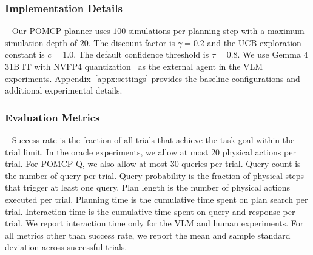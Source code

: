 \subsubsection{Implementation Details}~\label{exp:details}
Our POMCP planner uses $100$ simulations per planning step with a maximum simulation depth of $20$. The discount factor is $\gamma=0.2$ and the UCB exploration constant is $c=1.0$. The default confidence threshold is $\tau=0.8$. We use Gemma 4 31B IT with NVFP4 quantization~\citep{gemmateam2026gemma4} as the external agent in the VLM experiments. Appendix~\ref{appx:settings} provides the baseline configurations and additional experimental details.

\subsubsection{Evaluation Metrics}~\label{exp:metrics}
Success rate is the fraction of all trials that achieve the task goal within the trial limit. In the oracle experiments, we allow at most $20$ physical actions per trial. For POMCP-Q, we also allow at most $30$ queries per trial. Query count is the number of query per trial. Query probability is the fraction of physical steps that trigger at least one query. Plan length is the number of physical actions executed per trial. Planning time is the cumulative time spent on plan search per trial. Interaction time is the cumulative time spent on query and response per trial. We report interaction time only for the VLM and human experiments. For all metrics other than success rate, we report the mean and sample standard deviation across successful trials.

